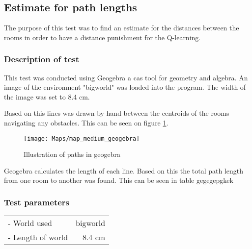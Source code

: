 \documentclass[../Head/Main.tex]{subfiles}
\begin{document}
\subsection{Estimate for path lengths}
\label{subsec:est_path_length}
The purpose of this test was to find an estimate for the distances between the rooms in order to have a distance punishment for the Q-learning.
\subsubsection{Description of test}
This test was conducted using Geogebra a cas tool for geometry and algebra. An image of the environment "bigworld" was loaded into the program. The width of the image was set to 8.4 cm.\par 
Based on this lines was drawn by hand between the centroids of the rooms navigating any obstacles. This can be seen on figure \ref{fig:geogebra}.
\begin{figure}[H]
	\centering
	\texttt{[image: Maps/map\_medium\_geogebra]}
	\caption{Illustration of paths in geogebra}
	\label{fig:geogebra}
\end{figure}
Geogebra calculates the length of each line. Based on this the total path length from one room to another was found. This can be seen in table gegegepgkek
\subsubsection{Test parameters}
\begin{tabular}{l r}
	- World used                & bigworld\\	
	- Length of world           & 8.4 cm\\
\end{tabular}
\end{document}
